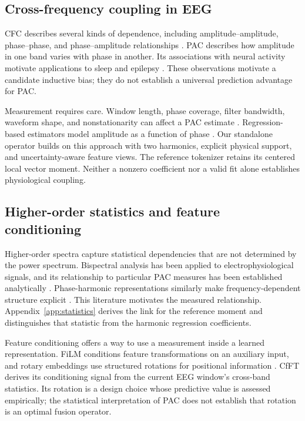 \documentclass[10pt,twocolumn,letterpaper]{article}
\begin{document}
\subsection{Cross-frequency coupling in EEG}
CFC describes several kinds of dependence, including amplitude--amplitude,
phase--phase, and phase--amplitude relationships
\citep{canolty2010functional,hyafil2015neural}.
PAC describes how amplitude in one band varies with phase in another.
Its associations with neural activity motivate applications to sleep and
epilepsy \citep{canolty2006high,amiri2016phase,edakawa2016detection}.
These observations motivate a candidate inductive bias; they do not
establish a universal prediction advantage for PAC.

Measurement requires care. Window length, phase coverage, filter
bandwidth, waveform shape, and nonstationarity can affect a PAC estimate
\citep{tort2010measuring,dvorak2014proper,aru2015untangling}.
Regression-based estimators model amplitude as a function of phase
\citep{penny2008nested,vanwijk2015parametric}. Our standalone operator
builds on this approach with two harmonics, explicit physical support,
and uncertainty-aware feature views. The reference tokenizer retains
its centered local vector moment. Neither a nonzero coefficient nor a
valid fit alone establishes physiological coupling.

\subsection{Higher-order statistics and feature conditioning}
Higher-order spectra capture statistical dependencies that are not
determined by the power spectrum. Bispectral analysis has been applied
to electrophysiological signals, and its relationship to particular
PAC measures has been established analytically
\citep{sigl1994introduction,kovach2018bispectrum}.
Phase-harmonic representations similarly make frequency-dependent
structure explicit \citep{mallat2019phaseharmoniccorrelationsconvolutional}.
This literature motivates the measured relationship. Appendix~\ref{app:statistics}
derives the link for the reference moment and distinguishes that
statistic from the harmonic regression coefficients.

Feature conditioning offers a way to use a measurement inside a learned
representation. FiLM conditions feature transformations on an auxiliary
input, and rotary embeddings use structured rotations for positional
information \citep{perez2018film,su2024roformer}.
CfFT derives its conditioning signal from the current EEG window's
cross-band statistics. Its rotation is a design choice whose predictive
value is assessed empirically; the statistical interpretation of PAC does
not establish that rotation is an optimal fusion operator.
\end{document}
